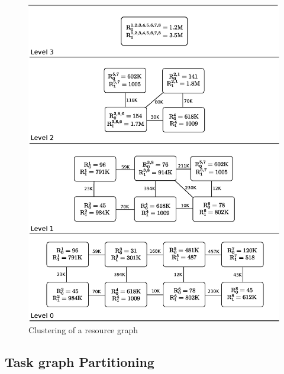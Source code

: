\begin{figure}[ht]
  \includegraphics[scale=0.43]{./figures/resource}
  \caption{Clustering of a resource graph}
  \label{fig:res}
\end{figure}


\subsection{Task graph Partitioning}
\label{sec:task-graph-part}

